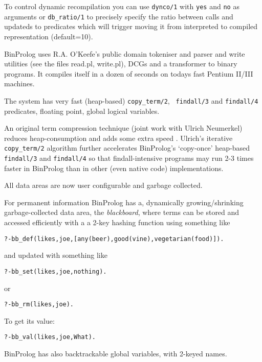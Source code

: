 \documentclass{article}
\begin{document}
To control dynamic recompilation you can use {\tt dynco/1} with {\tt yes}
and {\tt no} as arguments or {\tt db\_ratio/1} to precisely specify
the ratio between calls and updateds to predicates which will
trigger moving it from interpreted to compiled representation
(default=10).

BinProlog uses R.A. O'Keefe's public domain tokeniser and parser and
write utilities (see the files read.pl, write.pl), DCGs and a
transformer to binary programs. It compiles itself in a dozen of seconds on todays
fast Pentium II/III machines.

The system has very fast (heap-based) {\tt copy\_term/2}, {\tt
findall/3} and {\tt findall/4} predicates, floating point, global
logical variables.

An original term compression technique \cite{TN94:PLILP} (joint work with
Ulrich Neumerkel) reduces heap-consumption and adds some extra speed .
Ulrich's iterative {\tt copy\_term/2} algorithm further accelerates
BinProlog's `copy-once' heap-based {\tt findall/3} and {\tt findall/4}
so that findall-intensive programs may run 2-3 times faster in
BinProlog than in other (even native code) implementations.

All data areas are now user configurable and garbage collected.

For permanent information BinProlog has a, dynamically growing/shrinking
garbage-collected data area, the {\em blackboard}, 
where terms can be stored and accessed
efficiently with a a 2-key hashing function using something like

\begin{verbatim}
?-bb_def(likes,joe,[any(beer),good(vine),vegetarian(food)]).
\end{verbatim}

and updated with something like

\begin{verbatim}
?-bb_set(likes,joe,nothing).
\end{verbatim}

or 

\begin{verbatim}
?-bb_rm(likes,joe).
\end{verbatim}

To get its value:

\begin{verbatim}
?-bb_val(likes,joe,What).
\end{verbatim}

BinProlog  has also backtrackable global variables,
with 2-keyed names.
\end{document}
